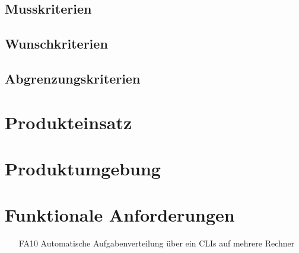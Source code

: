 \documentclass[a4paper,12pt]{article}
\begin{document}
\subsection{Musskriterien}
\subsection{Wunschkriterien}
\subsection{Abgrenzungskriterien}

\section{Produkteinsatz}

\section{Produktumgebung}

\section{Funktionale Anforderungen}
\begin{itemize}[nosep]
\item[FA10] Automatische Aufgabenverteilung über ein \glspl{CLI} auf mehrere Rechner
\end{itemize}








\end{document}
